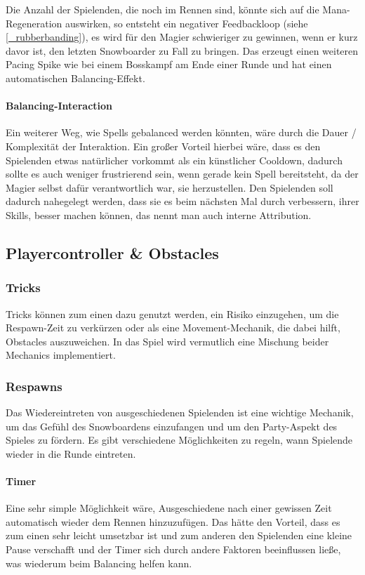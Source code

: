 Die Anzahl der Spielenden, die noch im Rennen sind, könnte sich auf die Mana-Regeneration auswirken, so entsteht ein negativer Feedbackloop (siehe \ref{_rubberbanding}), es wird für den Magier schwieriger zu gewinnen, wenn er kurz davor ist, den letzten Snowboarder zu Fall zu bringen. Das erzeugt einen weiteren Pacing Spike wie bei einem Bosskampf am Ende einer Runde und hat einen automatischen Balancing\cite[S. 296]{_game_design_workshop}-Effekt.

\paragraph{Balancing-Interaction\label{_balancing_interaction}}
Ein weiterer Weg, wie Spells gebalanced werden könnten, wäre durch die Dauer / Komplexität der Interaktion. Ein großer Vorteil hierbei wäre, dass es den Spielenden etwas natürlicher vorkommt als ein künstlicher Cooldown, dadurch sollte es auch weniger frustrierend sein, wenn gerade kein Spell bereitsteht, da der Magier selbst dafür verantwortlich war, sie herzustellen. Den Spielenden soll dadurch nahegelegt werden, dass sie es beim nächsten Mal durch verbessern, ihrer Skills, besser machen können, das nennt man auch interne Attribution\cite{_internal_attribution}.

\subsection{Playercontroller \& Obstacles\label{_playercontroller}}
\subsubsection{Tricks}
Tricks können zum einen dazu genutzt werden, ein Risiko einzugehen, um die Respawn-Zeit zu verkürzen oder als eine Movement-Mechanik, die dabei hilft, Obstacles auszuweichen. In das Spiel wird vermutlich eine Mischung beider Mechanics implementiert.

\subsubsection{Respawns}
Das Wiedereintreten von ausgeschiedenen Spielenden ist eine wichtige Mechanik, um das Gefühl des Snowboardens einzufangen und um den Party-Aspekt des Spieles zu fördern. Es gibt verschiedene Möglichkeiten zu regeln, wann Spielende wieder in die Runde eintreten.

\paragraph{Timer}
Eine sehr simple Möglichkeit wäre, Ausgeschiedene nach einer gewissen Zeit automatisch wieder dem Rennen hinzuzufügen. Das hätte den Vorteil, dass es zum einen sehr leicht umsetzbar ist und zum anderen den Spielenden eine kleine Pause verschafft und der Timer sich durch andere Faktoren beeinflussen ließe, was wiederum beim Balancing helfen kann.

